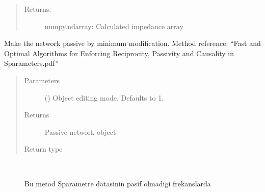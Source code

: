 \documentclass[letterpaper,10pt,english]{sphinxmanual}
\begin{document}
\begin{fulllineitems}
\begin{fulllineitems}
\begin{quote}
\begin{description}
\item[{Returns:}] \leavevmode
numpy.ndarray: Calculated impedance array

\end{description}
\end{quote}

\end{fulllineitems}


\begin{fulllineitems}
\label{\detokenize{touchstone:touchstone.spfile.restore_passivity}}
Make the network passive by minimum modification.
Method reference:
“Fast and Optimal Algorithms for Enforcing Reciprocity, Passivity and Causality in S\sphinxhyphen{}parameters.pdf”
\begin{quote}\begin{description}
\item[{Parameters}] \leavevmode
{} (\sphinxstyleliteralemphasis{\sphinxupquote{, }}) \textendash{} Object editing mode. Defaults to \sphinxhyphen{}1.

\item[{Returns}] \leavevmode
Passive network object

\item[{Return type}] \leavevmode
{\hyperref[\detokenize{touchstone:touchstone.spfile}]{}}

\end{description}\end{quote}

\end{fulllineitems}


\begin{fulllineitems}
\label{\detokenize{touchstone:touchstone.spfile.restore_passivity2}}~\begin{description}
\item[{}] \leavevmode
Bu metod S\sphinxhyphen{}parametre datasinin pasif olmadigi frekanslarda


\end{description}
\end{fulllineitems}
\end{fulllineitems}
\end{document}
